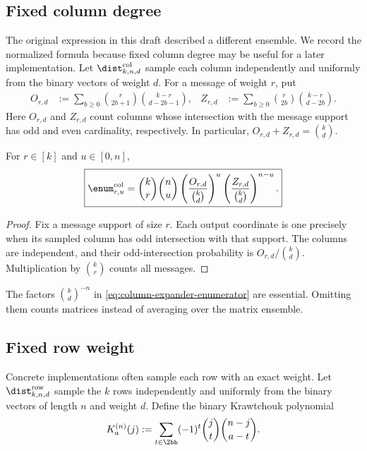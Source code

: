 \subsection{Fixed column degree}

The original expression in this draft described a different ensemble.  We
record the normalized formula because fixed column degree may be useful for a
later implementation.  Let $\dist^{\mathrm{col}}_{k,n,d}$ sample each column
independently and uniformly from the binary vectors of weight $d$.  For a
message of weight $r$, put
\begin{align}
 O_{r,d}
   &:=\sum_{b\geq 0}\binom{r}{2b+1}\binom{k-r}{d-2b-1},
 &
 Z_{r,d}
   &:=\sum_{b\geq 0}\binom{r}{2b}\binom{k-r}{d-2b}.
 \label{eq:column-expander-odd-even}
\end{align}
Here $O_{r,d}$ and $Z_{r,d}$ count columns whose intersection with the message
support has odd and even cardinality, respectively.  In particular,
$O_{r,d}+Z_{r,d}=\binom{k}{d}$.

\begin{lemma}
\label{lem:column-expander-enumerator}
For $r\in[k]$ and $u\in[0,n]$,
\begin{equation}
 \boxed{
 \enum^{\mathrm{col}}_{r,u}
   =
 \binom{k}{r}\binom{n}{u}
 \left(\frac{O_{r,d}}{\binom{k}{d}}\right)^u
 \left(\frac{Z_{r,d}}{\binom{k}{d}}\right)^{n-u}.
 }
 \label{eq:column-expander-enumerator}
\end{equation}
\end{lemma}

\begin{proof}
Fix a message support of size $r$.  Each output coordinate is one precisely
when its sampled column has odd intersection with that support.  The columns
are independent, and their odd-intersection probability is
$O_{r,d}/\binom{k}{d}$.  Multiplication by $\binom{k}{r}$ counts all messages.
\end{proof}

The factors $\binom{k}{d}^{-n}$ in
\eqref{eq:column-expander-enumerator} are essential.  Omitting them counts
matrices instead of averaging over the matrix ensemble.

\subsection{Fixed row weight}

Concrete implementations often sample each row with an exact weight.  Let
$\dist^{\mathrm{row}}_{k,n,d}$ sample the $k$ rows independently and uniformly
from the binary vectors of length $n$ and weight $d$.  Define the binary
Krawtchouk polynomial
\begin{equation}
 K_a^{(n)}(j)
   :=
 \sum_{t\in\Zbb}(-1)^t\binom{j}{t}\binom{n-j}{a-t}.
 \label{eq:krawtchouk-definition}
\end{equation}

